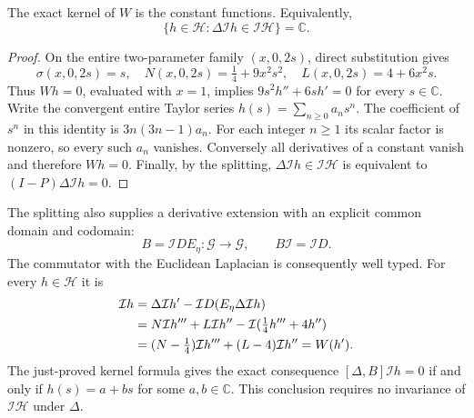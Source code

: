 \begin{cqproposition}
The exact kernel of $W$ is the constant functions. Equivalently,
\[
 \{h\in\mathscr H:\Delta \mathcal I h\in \mathcal I \mathscr H\}=\mathbb C.
\]
\end{cqproposition}
\begin{proof}
On the entire two-parameter family $(x,0,2s)$, direct substitution gives
\[
 \sigma(x,0,2s)=s,\quad
 N(x,0,2s)=\tfrac14+9x^2s^2,\quad
 L(x,0,2s)=4+6x^2s .
\]
Thus $Wh=0$, evaluated with $x=1$, implies
$9s^2h''+6sh'=0$ for every $s\in\mathbb C$.
Write the convergent entire Taylor series $h(s)=\sum_{n\ge0}a_ns^n$.
The coefficient of $s^n$ in this identity is $3n(3n-1)a_n$.
For each integer $n\ge1$ its scalar factor is nonzero, so every such
$a_n$ vanishes. Conversely all derivatives of a constant vanish and
therefore $Wh=0$. Finally, by the splitting,
$\Delta \mathcal I h\in \mathcal I \mathscr H$ is equivalent to $(I-P)\Delta \mathcal I h=0$.
\end{proof}

The splitting also supplies a derivative extension with an explicit
common domain and codomain:
\[
 B=\mathcal I DE_\eta:\mathscr G\longrightarrow\mathscr G,\qquad B\mathcal I =\mathcal I D .
\]
The commutator with the Euclidean Laplacian is consequently well typed.
For every $h\in\mathscr H$ it is
\begin{align}
 [\Delta,B]\mathcal I h
 &=\Delta \mathcal I h'-\mathcal I D(E_\eta\Delta \mathcal I h)\notag\\
 &=N\mathcal I h'''+L\mathcal I h''-\mathcal I (\tfrac14h'''+4h'')\notag\\
 &=(N-\tfrac14)\mathcal I h'''+(L-4)\mathcal I h''=W(h').
 \label{eq:cq-spatial-commutator}
\end{align}
The just-proved kernel formula gives the exact consequence
$[\Delta,B]\mathcal I h=0$ if and only if $h(s)=a+bs$ for some $a,b\in\mathbb C$.
This conclusion requires no invariance of $\mathcal I \mathscr H$ under $\Delta$.

